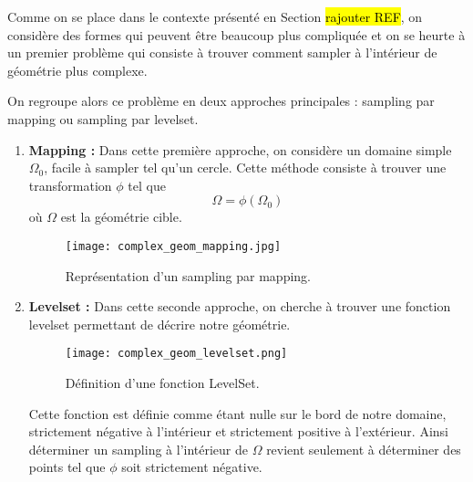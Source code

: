 Comme on se place dans le contexte présenté en Section \hl{rajouter REF}, on considère des formes qui peuvent être beaucoup plus compliquée et on se heurte à un premier problème qui consiste à trouver comment sampler à l'intérieur de géométrie plus complexe.

On regroupe alors ce problème en deux approches principales : sampling par mapping ou sampling par levelset.

\begin{enumerate}[label=\textbullet]
	\item \textbf{Mapping :} Dans cette première approche, on considère un domaine simple $\Omega_0$, facile à sampler tel qu'un cercle. Cette méthode consiste à trouver une transformation $\phi$ tel que
	\begin{equation*}
		\Omega = \phi(\Omega_0)
	\end{equation*}
	où $\Omega$ est la géométrie cible.
	\begin{figure}[H]
		\centering
		\texttt{[image: complex\_geom\_mapping.jpg]}
		\caption{Représentation d'un sampling par mapping.}
	\end{figure}

	\item \textbf{Levelset :} Dans cette seconde approche, on cherche à trouver une fonction levelset permettant de décrire notre géométrie.
	\begin{figure}[H]
		\centering
		\texttt{[image: complex\_geom\_levelset.png]}
		\caption{Définition d'une fonction LevelSet.}
	\end{figure}
	Cette fonction est définie comme étant nulle sur le bord de notre domaine, strictement négative à l'intérieur et strictement positive à l'extérieur. Ainsi déterminer un sampling à l'intérieur de $\Omega$ revient seulement à déterminer des points tel que $\phi$ soit strictement négative.
\end{enumerate}

